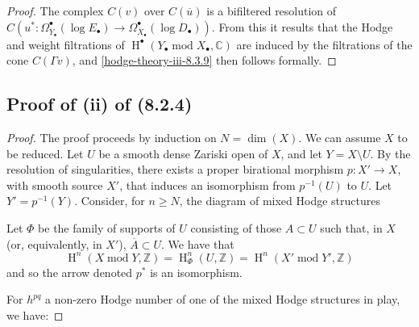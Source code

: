 \begin{proof}
      The complex \(C(v)\) over \(C(\overline {u})\) is a bifiltered resolution of \(C(u^*\colon \Omega _{\overline {Y}_\bullet }^\bullet (\log  E_\bullet )\to \Omega _{\overline {X}_\bullet }^\bullet (\log  D_\bullet ))\).
      From this it results that the Hodge and weight filtrations of \(\operatorname {H}^\bullet (Y_\bullet \operatorname {mod} X_\bullet ,\mathbb {C})\) are induced by the filtrations of the cone \(C(\Gamma  v)\), and \cref{hodge-theory-iii-8.3.9} then follows formally.\end{proof}\subsection{Proof of (ii) of (8.2.4)}\label{hodge-theory-iii-8.3.10}\begin{proof}\par{}The proof proceeds by induction on \(N=\dim (X)\).
      We can assume \(X\) to be reduced.
      Let \(U\) be a smooth dense Zariski open of \(X\), and let \(Y=X\setminus  U\).
      By the resolution of singularities, there exists a proper birational morphism \(p\colon  X'\to  X\), with smooth source \(X'\), that induces an isomorphism from \(p^{-1}(U)\) to \(U\).
      Let \(Y'=p^{-1}(Y)\).
      Consider, for \(n\geqslant  N\), the diagram of mixed Hodge structures
      

      Let \(\Phi \) be the family of supports of \(U\) consisting of those \(A\subset  U\) such that, in \(X\) (or, equivalently, in \(X'\)), \(\overline {A}\subset  U\).
      We have that
      \[         \operatorname {H}^n(X\operatorname {mod} Y,\mathbb {Z})         = \operatorname {H}_\Phi ^n(U,\mathbb {Z})         = \operatorname {H}^n(X'\operatorname {mod} Y',\mathbb {Z})       \]
      and so the arrow denoted \(p^*\) is an isomorphism.\par{}For \(h^{pq}\) a non-zero Hodge number of one of the mixed Hodge structures in play, we have:
      

\end{proof}
